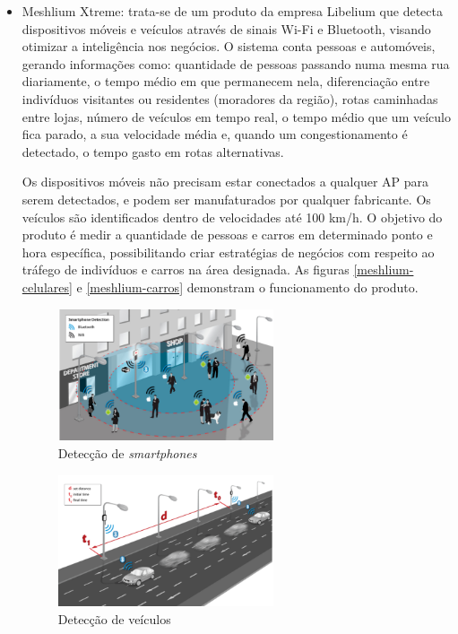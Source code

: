\begin{itemize}
\item Meshlium Xtreme: trata-se de um produto da empresa Libelium que detecta dispositivos  móveis e veículos através de sinais Wi-Fi e Bluetooth, visando otimizar a inteligência nos negócios. O sistema conta pessoas e automóveis, gerando informações \cite{libelium} como: quantidade de pessoas passando numa mesma rua diariamente, o tempo médio em que permanecem nela, diferenciação entre indivíduos visitantes ou residentes (moradores da região), rotas caminhadas entre lojas, número de veículos em tempo real, o tempo médio que um veículo fica parado, a sua velocidade média e, quando um congestionamento é detectado, o tempo gasto em rotas alternativas.

Os dispositivos móveis não precisam estar conectados a qualquer AP para serem detectados, e podem ser manufaturados por qualquer fabricante. Os veículos são identificados dentro de velocidades até 100 km/h. O objetivo do produto é medir a quantidade de pessoas e carros em determinado ponto e hora específica, possibilitando criar estratégias de negócios com respeito ao tráfego de indivíduos e carros na área designada. As figuras
\autoref{meshlium-celulares} e \autoref{meshlium-carros} demonstram o
funcionamento do produto.

\begin{figure}[htb]
  \caption{\label{meshlium-celulares}Detecção de \emph{smartphones}}
  \begin{center}
    \includegraphics[width=0.60\textwidth]{img/meshlium-celulares.png}
  \end{center}
\end{figure}

\begin{figure}[htb]
  \caption{\label{meshlium-carros}Detecção de veículos}
  \begin{center}
    \includegraphics[width=0.60\textwidth]{img/meshlium-carros.png}
  \end{center}
\end{figure}


\end{itemize}
